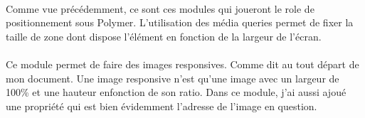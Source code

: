 \documentclass{article}
\begin{document}
\vspace{0.5cm}\\
Comme vue pr\'ec\'edemment, ce sont ces modules qui joueront le role de positionnement sous Polymer. L'utilisation des m\'edia queries permet de fixer la taille de zone dont dispose l'\'el\'ement en fonction de la largeur de l'\'ecran.
\vspace{0.5cm}\\
\vspace{0.5cm}\\
Ce module permet de faire des images responsives. Comme dit au tout d\'epart de mon document. Une image responsive n'est qu'une image avec un largeur de 100\% et une hauteur enfonction de son ratio. Dans ce module, j'ai aussi ajou\'e une propri\'et\'e qui est bien \'evidemment l'adresse de l'image en question.
\end{document}
